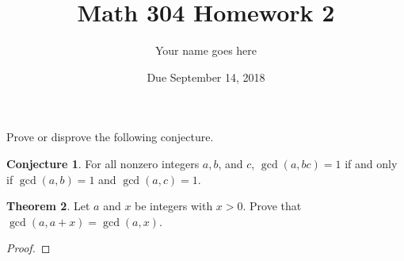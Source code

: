 \documentclass[11pt]{article}		%
\title{Math 304 Homework 2}
\author{Your name goes here}
\date{Due September 14, 2018}
\theoremstyle{definition}
\newtheorem{theorem}{Theorem}
\newtheorem{conj}[theorem]{Conjecture}
\begin{document}
\maketitle



Prove or disprove the following conjecture.

\begin{conj}
	For all nonzero integers $a,b$, and $c$, $\gcd(a,bc)=1$ if and only if $\gcd(a,b)=1$ and $\gcd(a,c)=1$.
\end{conj}



\begin{theorem}
	Let $a$ and $x$ be integers with $x > 0$.
	Prove that $\gcd(a,a+x) = \gcd(a,x)$.
\end{theorem}

\begin{proof}
	
\end{proof}
\end{document}
